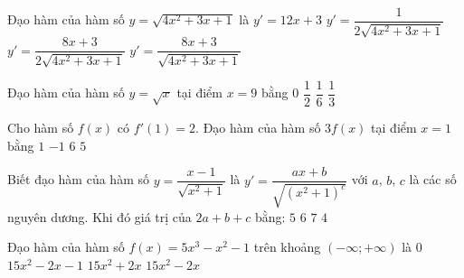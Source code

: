 \begin{ex}%
	Đạo hàm  của hàm số $y=\sqrt{4x^2+3x+1}$ là
	\choice 
		 {$y'=12x+3$}
		{$y'=\dfrac{1}{2\sqrt{4x^2+3x+1}}$} 
		{\True  $y'=\dfrac{8x+3}{2\sqrt{4x^2+3x+1}}$}
		 {$y'=\dfrac{8x+3}{\sqrt{4x^2+3x+1}}$}
\end{ex}

\begin{ex}%
	Đạo hàm của hàm số $y=\sqrt{x}$  tại điểm $x=9$ bằng
	 \choice
		 {$0$}
		 {$\dfrac{1}{2}$}
		{\True  $\dfrac{1}{6}$}
		{$\dfrac{1}{3}$} 
\end{ex}

\begin{ex}%
	Cho hàm số $f(x)$ có $f'(1)=2$. Đạo hàm của hàm số $3 f(x)$  tại điểm $x=1$ bằng
	\choice 
		{$1$} 
		 {$-1$}
		 {\True $6$}
		{$5$} 
\end{ex}

\begin{ex}%
	Biết đạo hàm của hàm số $y=\dfrac{x-1}{\sqrt{x^{2}+1}}$ là $y'=\dfrac{ax+b}{\sqrt{\left(x^{2}+1\right)^{c}}}$ với $a$, $b$, $c$ là các số nguyên dương. Khi đó giá trị của $2a+b+c$ bằng: 
	\choice 
		 {$5$}
		 {\True $6$}
		{$7$} 
		{$4$} 
\end{ex}

\begin{ex}%
	Đạo hàm của hàm số $f(x)=5x^3-x^2-1$ trên khoảng $(-\infty;+\infty)$ là 
	 \choice
		{$0$} 
		{$15x^2-2x-1$} 
		 {$15x^2+2x$}
		{\True $15x^2-2x$} 
\end{ex}

